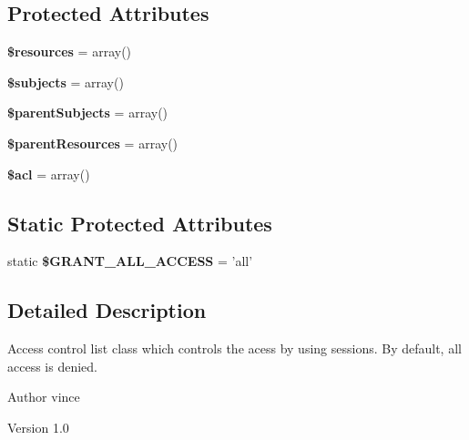 \subsection*{Protected Attributes}
\begin{DoxyCompactItemize}
\item 
\hypertarget{class_anemo_1_1_a_c_l_ad57e7e99506ffd448d98e036b1a8da50}{
{\bfseries \$resources} = array()}
\label{class_anemo_1_1_a_c_l_ad57e7e99506ffd448d98e036b1a8da50}

\item 
\hypertarget{class_anemo_1_1_a_c_l_a1207745f75c7cc4155ecb82c6271e1b3}{
{\bfseries \$subjects} = array()}
\label{class_anemo_1_1_a_c_l_a1207745f75c7cc4155ecb82c6271e1b3}

\item 
\hypertarget{class_anemo_1_1_a_c_l_a24d761413df70e449c0f7aa0243ada47}{
{\bfseries \$parentSubjects} = array()}
\label{class_anemo_1_1_a_c_l_a24d761413df70e449c0f7aa0243ada47}

\item 
\hypertarget{class_anemo_1_1_a_c_l_a230896d04cc88e5b5156e27a0daba158}{
{\bfseries \$parentResources} = array()}
\label{class_anemo_1_1_a_c_l_a230896d04cc88e5b5156e27a0daba158}

\item 
\hypertarget{class_anemo_1_1_a_c_l_a896b3f6f6b6fea4856526607cf007d3e}{
{\bfseries \$acl} = array()}
\label{class_anemo_1_1_a_c_l_a896b3f6f6b6fea4856526607cf007d3e}

\end{DoxyCompactItemize}
\subsection*{Static Protected Attributes}
\begin{DoxyCompactItemize}
\item 
\hypertarget{class_anemo_1_1_a_c_l_a622fe2982257662fa696c96dcb528da1}{
static {\bfseries \$GRANT\_\-ALL\_\-ACCESS} = 'all'}
\label{class_anemo_1_1_a_c_l_a622fe2982257662fa696c96dcb528da1}

\end{DoxyCompactItemize}


\subsection{Detailed Description}
Access control list class which controls the acess by using sessions. By default, all access is denied. \begin{DoxyAuthor}{Author}
vince 
\end{DoxyAuthor}
\begin{DoxyVersion}{Version}
1.0 
\end{DoxyVersion}


